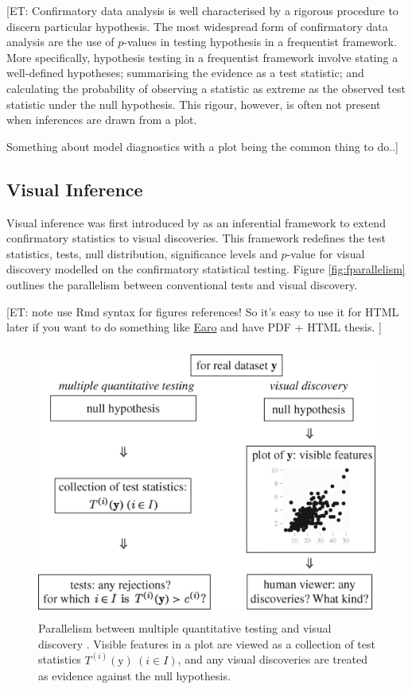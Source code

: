 \documentclass{monashthesis}
\begin{document}
{[}ET: Confirmatory data analysis is well characterised by a rigorous procedure to discern particular hypothesis. The most widespread form of confirmatory data analysis are the use of \(p\)-values in testing hypothesis in a frequentist framework. More specifically, hypothesis testing in a frequentist framework involve stating a well-defined hypotheses; summarising the evidence as a test statistic; and calculating the probability of observing a statistic as extreme as the observed test statistic under the null hypothesis. This rigour, however, is often not present when inferences are drawn from a plot.

Something about model diagnostics with a plot being the common thing to do..{]}

\hypertarget{visual-inference-1}{%
\subsection{Visual Inference}\label{visual-inference-1}}

Visual inference was first introduced by \textcite{buja_statistical_2009} as an inferential framework to extend confirmatory statistics to visual discoveries. This framework redefines the test statistics, tests, null distribution, significance levels and \(p\)-value for visual discovery modelled on the confirmatory statistical testing. Figure \ref{fig:fparallelism} outlines the parallelism between conventional tests and visual discovery.

{[}ET: note use Rmd syntax for figures references! So it's easy to use it for HTML later if you want to do something like \href{https://github.com/earowang/thesis}{Earo} and have PDF + HTML thesis. {]}

\begin{figure}
\centering
\includegraphics[width=4.6875in,height=3.55208in]{figures/rsta2009012001.jpg}
\caption{Parallelism between multiple quantitative testing and visual discovery \autocite{buja_statistical_2009}. Visible features in a plot are viewed as a collection of test statistics \(T^{(i)}(\boldsymbol{\mathrm{y}})~(i \in I)\), and any visual discoveries are treated as evidence against the null hypothesis. \label{fig:parallelism}}
\end{figure}
\end{document}
